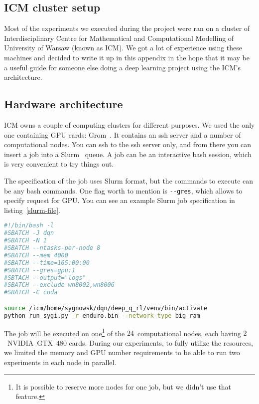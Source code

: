 \begin{appendices}
  
\chapter{ICM cluster setup}\label{icm}
Most of the experiments we executed during the project were ran on a cluster of Interdisciplinary Centre for Mathematical and Computational Modelling of University of Warsaw (known as ICM). We got a lot of experience using these machines and decided to write it up in this appendix in the hope that it may be a useful guide for someone else doing a deep learning project using the ICM's architecture.

\section{Hardware architecture}
  ICM owns a couple of computing clusters for different purposes. We used the only one containing GPU cards: Grom~\cite[in polish]{grom-icm}. It contains an ssh server and a number of computational nodes. You can ssh to the ssh server only, and from there you can insert a job into a Slurm~\cite{slurm} queue. A job can be an interactive bash session, which is very convenient to try things out.
  
  The specification of the job uses Slurm format, but the commands to execute can be any bash commands. One flag worth to mention is \texttt{-{}-gres}, which allows to specify request for GPU. You can see an example Slurm job specification in listing~\ref{slurm-file}.

  \begin{lstlisting}[language=bash, caption={Example Slurm job specification}, label={slurm-file}]
#!/bin/bash -l
#SBATCH -J dqn
#SBATCH -N 1
#SBATCH --ntasks-per-node 8
#SBATCH --mem 4000
#SBATCH --time=165:00:00
#SBATCH --gres=gpu:1
#SBTACH --output="logs"
#SBATCH --exclude wn8002,wn8006
#SBATCH -C cuda

source /icm/home/sygnowsk/dqn/deep_q_rl/venv/bin/activate
python run_sygi.py -r enduro.bin --network-type big_ram
\end{lstlisting}

The job will be executed on one\footnote{It is possible to reserve more nodes for one job, but we didn't use that feature.} of the $24$~computational nodes, each having $2$~NVIDIA~GTX~$480$ cards. During our experiments, to fully utilize the resources, we limited the memory and GPU number requirements to be able to run two experiments in each node in parallel.


\end{appendices}
